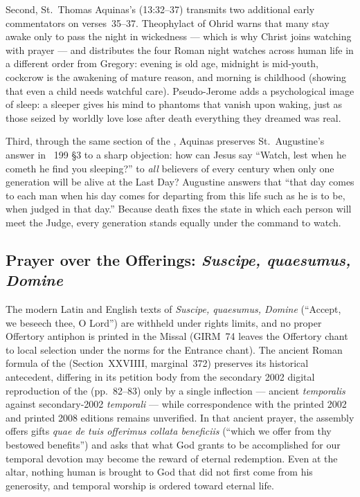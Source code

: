 Second, St.~Thomas Aquinas's  (13:32--37) transmits two additional early commentators on verses~35--37. Theophylact of Ohrid warns that many stay awake only to pass the night in wickedness --- which is why Christ joins watching with prayer --- and distributes the four Roman night watches across human life in a different order from Gregory: evening is old age, midnight is mid-youth, cockcrow is the awakening of mature reason, and morning is childhood (showing that even a child needs watchful care). Pseudo-Jerome adds a psychological image of sleep: a sleeper gives his mind to phantoms that vanish upon waking, just as those seized by worldly love lose after death everything they dreamed was real.

Third, through the same section of the , Aquinas preserves St.~Augustine's answer in ~199 §3 to a sharp objection: how can Jesus say ``Watch, lest when he cometh he find you sleeping?'' to \emph{all} believers of every century when only one generation will be alive at the Last Day? Augustine answers that ``that day comes to each man when his day comes for departing from this life such as he is to be, when judged in that day.'' Because death fixes the state in which each person will meet the Judge, every generation stands equally under the command to watch.

\subsection{Prayer over the Offerings: \emph{Suscipe, quaesumus, Domine}}

The modern Latin and English texts of \emph{Suscipe, quaesumus, Domine} (``Accept, we beseech thee, O Lord'') are withheld under rights limits, and no proper Offertory antiphon is printed in the Missal (GIRM~74 leaves the Offertory chant to local selection under the norms for the Entrance chant). The ancient Roman formula of the  (Section~XXVIIII, marginal~372) preserves its historical antecedent, differing in its petition body from the secondary 2002 digital reproduction of the  (pp.~82--83) only by a single inflection --- ancient \emph{temporalis} against secondary-2002 \emph{temporali} --- while correspondence with the printed 2002 and printed 2008 editions remains unverified. In that ancient prayer, the assembly offers gifts \emph{quae de tuis offerimus collata beneficiis} (``which we offer from thy bestowed benefits'') and asks that what God grants to be accomplished for our temporal devotion may become the reward of eternal redemption. Even at the altar, nothing human is brought to God that did not first come from his generosity, and temporal worship is ordered toward eternal life.

